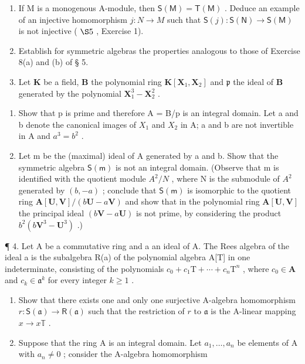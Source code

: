 \BourbakiExercisesSection

\begin{enumerate}
\def\labelenumi{\arabic{enumi}.}
\item
  If M is a monogenous A-module, then \(\mathsf{S}(\mathsf{M}) = \mathsf{T}(\mathsf{M})\) . Deduce an example of an injective homomorphism \(j: N \to M\) such that \(\mathsf{S}(j): \mathsf{S}(\mathsf{N}) \to \mathsf{S}(\mathsf{M})\) is not injective ( \(\S 5\) , Exercise 1).
\item
  Establish for symmetric algebras the properties analogous to those of Exercise 8(a) and (b) of § 5.
\item
  Let \(\mathbf{K}\) be a field, \(\mathbf{B}\) the polynomial ring \(\mathbf{K}[\mathbf{X}_1, \mathbf{X}_2]\) and \(\mathfrak{p}\) the ideal of \(\mathbf{B}\) generated by the polynomial \(\mathbf{X}_1^3 - \mathbf{X}_2^2\) .
\end{enumerate}

\begin{enumerate}
\def\labelenumi{(\alph{enumi})}
\item
  Show that p is prime and therefore A = B/p is an integral domain. Let a and b denote the canonical images of \(X_{1}\) and \(X_{2}\) in A; a and b are not invertible in A and \(a^{3} = b^{2}\) .
\item
  Let m be the (maximal) ideal of A generated by a and b. Show that the symmetric algebra \(\mathsf{S}(\mathsf{m})\) is not an integral domain. (Observe that m is identified with the quotient module \(A^{2}/N\) , where N is the submodule of \(A^{2}\) generated by \((b, -a)\) ; conclude that \(\mathsf{S}(\mathsf{m})\) is isomorphic to the quotient ring \(\mathbf{A}[\mathbf{U}, \mathbf{V}]/(b\mathbf{U} - a\mathbf{V})\) and show that in the polynomial ring \(\mathbf{A}[\mathbf{U}, \mathbf{V}]\) the principal ideal \((b\mathbf{V} - a\mathbf{U})\) is not prime, by considering the product \(b^{2}(b\mathbf{V}^{3} - \mathbf{U}^{3})\) .)
\end{enumerate}

¶ 4. Let A be a commutative ring and a an ideal of A. The Rees algebra of the ideal a is the subalgebra R(a) of the polynomial algebra A{[}T{]} in one indeterminate, consisting of the polynomials \(c_{0} + c_{1}\mathrm{T} + \cdots + c_{n}\mathrm{T}^{n}\) , where \(c_{0} \in \mathbf{A}\) and \(c_{k} \in \mathfrak{a}^{k}\) for every integer \(k \geqslant 1\) .

\begin{enumerate}
\def\labelenumi{(\alph{enumi})}
\item
  Show that there exists one and only one surjective A-algebra homomorphism \(r: \mathsf{S}(\mathfrak{a}) \to \mathsf{R}(\mathfrak{a})\) such that the restriction of \(r\) to \(\mathfrak{a}\) is the A-linear mapping \(x \to x\mathbb{T}\) .
\item
  Suppose that the ring A is an integral domain. Let \(a_1, \ldots, a_n\) be elements of A with \(a_n \neq 0\) ; consider the A-algebra homomorphism
\end{enumerate}

